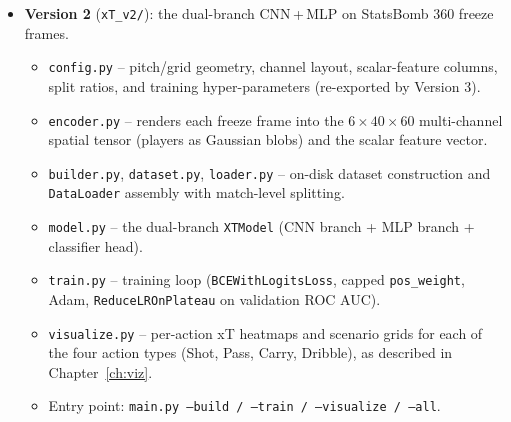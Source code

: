 \begin{itemize}
    \item \textbf{Version 2} (\texttt{xT\_v2/}): the dual-branch CNN\,+\,MLP on StatsBomb 360 freeze frames.
    \begin{itemize}
        \item \texttt{config.py} -- pitch/grid geometry, channel layout, scalar-feature columns, split ratios, and training hyper-parameters (re-exported by Version 3).
        \item \texttt{encoder.py} -- renders each freeze frame into the $6\times40\times60$ multi-channel spatial tensor (players as Gaussian blobs) and the scalar feature vector.
        \item \texttt{builder.py}, \texttt{dataset.py}, \texttt{loader.py} -- on-disk dataset construction and \texttt{DataLoader} assembly with match-level splitting.
        \item \texttt{model.py} -- the dual-branch \texttt{XTModel} (CNN branch + MLP branch + classifier head).
        \item \texttt{train.py} -- training loop (\texttt{BCEWithLogitsLoss}, capped \texttt{pos\_weight}, Adam, \texttt{ReduceLROnPlateau} on validation ROC AUC).
        \item \texttt{visualize.py} -- per-action xT heatmaps and scenario grids for each of the four action types (Shot, Pass, Carry, Dribble), as described in Chapter~\ref{ch:viz}.
        \item Entry point: \texttt{main.py --build / --train / --visualize / --all}.
    \end{itemize}


\end{itemize}
